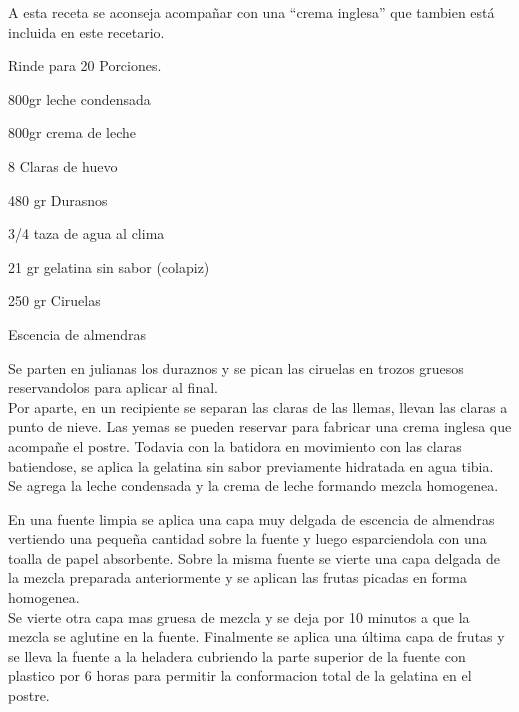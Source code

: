 A esta receta se aconseja acompañar con una “crema inglesa” que tambien está incluida en este recetario.

Rinde para 20 Porciones.\\

\begin{ingredientes}
\item 800gr leche condensada
\item 800gr crema de leche
\item 8 Claras de huevo
\item 480 gr Durasnos
\item 3/4 taza de agua al clima
\item 21 gr gelatina sin sabor (colapiz)
\item 250 gr Ciruelas
\item Escencia de almendras
\end{ingredientes}
\preparacion

Se parten en julianas los duraznos y se pican las ciruelas en trozos gruesos reservandolos para aplicar al final.\\

Por aparte, en un recipiente se separan las claras de las llemas, llevan las claras a punto de nieve. Las yemas se pueden reservar para fabricar una crema inglesa que acompañe el postre. Todavia con la batidora en movimiento con las claras batiendose, se aplica la gelatina sin sabor previamente hidratada en agua tibia. Se agrega la leche condensada y la crema de leche formando mezcla homogenea.

En una fuente limpia se aplica una capa muy delgada de escencia de almendras vertiendo una pequeña cantidad sobre la fuente y luego esparciendola con una toalla de papel absorbente. Sobre la misma fuente se vierte una capa delgada de la mezcla preparada anteriormente y se aplican las frutas picadas en forma homogenea.\\

Se vierte otra capa mas gruesa de mezcla y se deja por 10 minutos a que la mezcla se aglutine en la fuente. Finalmente se aplica una última capa de frutas y se lleva la fuente a la heladera cubriendo la parte superior de la fuente con plastico por 6 horas para permitir la conformacion total de la gelatina en el postre.